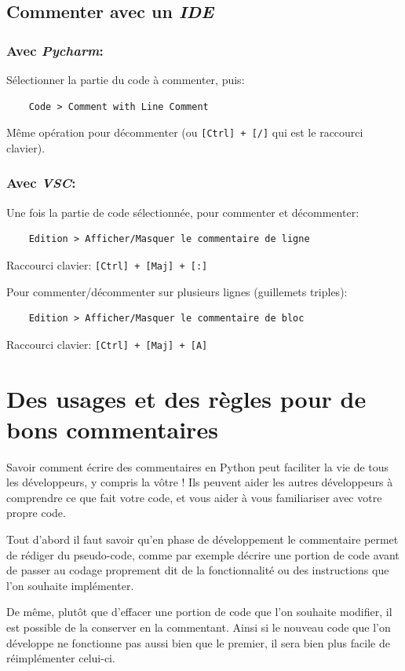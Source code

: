 \documentclass[a4paper,11pt]{book}
\begin{document}
\subsection*{Commenter avec un \textit{IDE}}
\subsubsection*{Avec \textit{Pycharm}:}
Sélectionner la partie du code à commenter, puis:
\begin{verbatim}
    Code > Comment with Line Comment
\end{verbatim}
Même opération pour décommenter (ou \texttt{[Ctrl] + [/]} qui est le raccourci clavier).
\medskip

\subsubsection*{Avec \textit{VSC}:}
Une fois la partie de code sélectionnée, pour commenter et décommenter:
\begin{verbatim}
    Edition > Afficher/Masquer le commentaire de ligne
\end{verbatim}
Raccourci clavier: \texttt{[Ctrl] + [Maj] + [:]}
\medskip

Pour commenter/décommenter sur plusieurs lignes (guillemets triples):
\begin{verbatim}
    Edition > Afficher/Masquer le commentaire de bloc
\end{verbatim}
Raccourci clavier: \texttt{[Ctrl] + [Maj] + [A]}
\medskip

\section{Des usages et des règles pour de bons commentaires}
Savoir comment écrire des commentaires en Python peut faciliter la vie de tous les développeurs, y compris la vôtre ! Ils peuvent aider les autres développeurs à comprendre ce que fait votre code, et vous aider à vous familiariser avec votre propre code.
\medskip

Tout d'abord il faut savoir qu'en phase de développement le commentaire permet de rédiger du pseudo-code, comme par exemple décrire une portion de code avant de passer au codage proprement dit de la fonctionnalité ou des instructions que l'on souhaite implémenter.
\medskip

De même, plutôt que d'effacer une portion de code que l'on souhaite modifier, il est possible de la conserver en la commentant. Ainsi si le nouveau code que l'on développe ne fonctionne pas aussi bien que le premier, il sera bien plus facile de réimplémenter celui-ci.
\medskip
\end{document}
